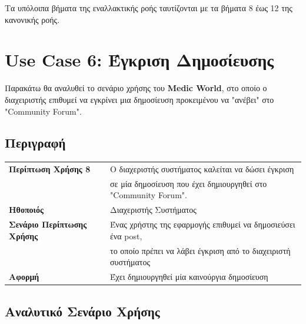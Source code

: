 \documentclass{article}
\newcommand\T{\rule{0pt}{2.6ex}}       %
\newcommand\B{\rule[-1.2ex]{0pt}{0pt}}
\begin{document}
\par Τα υπόλοιπα βήματα της εναλλακτικής ροής ταυτίζονται με τα βήματα 8 έως 12 της κανονικής ροής.

\section{Use Case 6: Έγκριση Δημοσίευσης}

Παρακάτω θα αναλυθεί το σενάριο χρήσης του \textbf{Medic World}, στο οποίο ο διαχειριστής επιθυμεί να εγκρίνει μια δημοσίευση προκειμένου να "ανέβει" στο "Community Forum".

\subsection{Περιγραφή}

\begin{center}
     \begin{tabular}{|l|l|}
     \hline
      \textbf{Περίπτωση Χρήσης 8} & Ο διαχεριστής συστήματος καλείται να δώσει έγκριση \T \\& σε μία δημοσίευση που έχει δημιουργηθεί στο "Community Forum". \B \\ 
      \hline
      \textbf{Ηθοποιός} & Διαχεριστής Συστήματος\T\B \\
      \hline
      \textbf{Σενάριο Περίπτωσης Χρήσης} & Ένας χρήστης της εφαρμογής επιθυμεί να δημοσιεύσει ένα post, \T \\&  το οποίο πρέπει να λάβει έγκριση από το διαχειριστή συστήματος\B \\
      \hline
      \textbf{Αφορμή} & Έχει δημιουργηθεί μία καινούργια δημοσίευση\T\B \\
      \hline
     \end{tabular}
 \end{center}
 
 \subsection{ Αναλυτικό Σενάριο Χρήσης}
 
\end{document}
